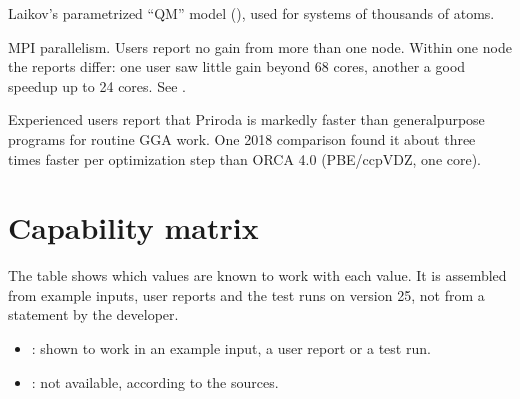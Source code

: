 \documentclass[letterpaper,10pt,english,openany,oneside]{sphinxmanual}
\begin{document}
\begin{description}
\sphinxAtStartPar
Laikov’s parametrized “QM” model ({\hyperref[\detokenize{reference/control:control-theory}]{}}), used for systems of thousands of atoms.



\sphinxAtStartPar
MPI parallelism. Users report no gain from more than one node. Within one node the reports differ: one user saw
little gain beyond 6\textendash{}8 cores, another a good speed\sphinxhyphen{}up up to 24 cores. See {\hyperref[\detokenize{start/parallel::doc}]{}}.



\end{description}

\sphinxAtStartPar
Experienced users report that Priroda is markedly faster than general\sphinxhyphen{}purpose programs for routine GGA work. One
2018 comparison found it about three times faster per optimization step than ORCA 4.0 (PBE/cc\sphinxhyphen{}pVDZ, one core).




\section{Capability matrix}
\label{\detokenize{start/about:capability-matrix}}
\sphinxAtStartPar
The table shows which  values are known to work with each  value. It is assembled from example inputs,
user reports and the test runs on version 25, not from a statement by the developer.
\begin{itemize}
\item {} 
\sphinxAtStartPar
{}: shown to work in an example input, a user report or a test run.

\item {} 
\sphinxAtStartPar
{}: not available, according to the sources.

\end{itemize}
\end{document}
